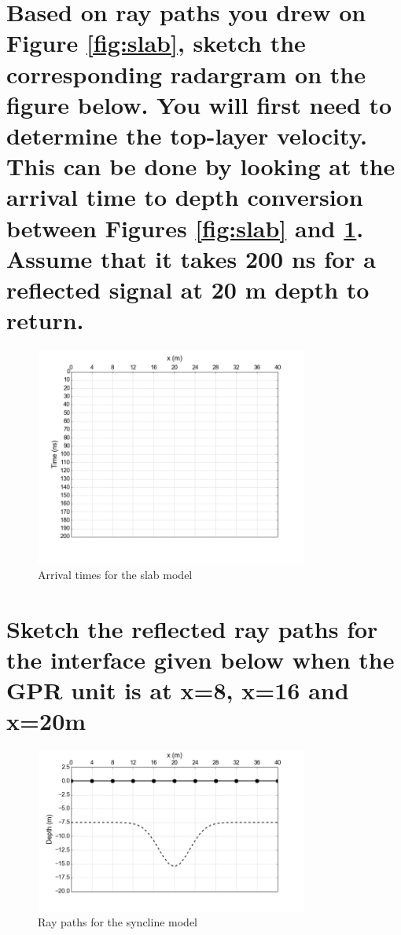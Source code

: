 \documentclass[twosides]{EOSC350Lab} %
\begin{document}
		\part{Based on ray paths you drew on Figure \ref{fig:slab}, sketch the corresponding radargram on the figure below. You will first need to determine the top-layer velocity. This can be done by looking at the arrival time to depth conversion between Figures \ref{fig:slab} and \ref{fig:t_xgrid_sketch}. Assume that it takes 200 ns for a reflected signal at 20 m depth to return.}
			\begin{figure}[H]
				\centering \includegraphics[width=0.8\textwidth]{Figures/t_xgrid.png}
				\caption{Arrival times for the slab model}
				\label{fig:t_xgrid_sketch}
			\end{figure}







		\part{Sketch the reflected ray paths for the interface given below when the GPR unit is at x=8, x=16 and x=20m}
			\begin{figure}[H]
				\centering \includegraphics[width=0.8\textwidth]{Figures/anticline.png}
				\caption{Ray paths for the syncline model}
				\label{fig:syncline}
			\end{figure}
\end{document}
